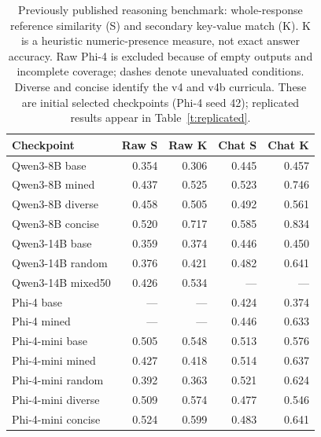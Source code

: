 \begin{table}[t]
\caption{Previously published reasoning benchmark: whole-response reference similarity (S) and secondary key-value match (K). K is a heuristic numeric-presence measure, not exact answer accuracy. Raw Phi-4 is excluded because of empty outputs and incomplete coverage; dashes denote unevaluated conditions. Diverse and concise identify the v4 and v4b curricula. These are initial selected checkpoints (Phi-4 seed 42); replicated results appear in Table~\ref{t:replicated}.}\label{t:energybench}
\centering\small\begin{tabular}{lrrrr}\toprule
Checkpoint & Raw S & Raw K & Chat S & Chat K\\\midrule
Qwen3-8B base & 0.354 & 0.306 & 0.445 & 0.457\\
Qwen3-8B mined & 0.437 & 0.525 & 0.523 & 0.746\\
Qwen3-8B diverse & 0.458 & 0.505 & 0.492 & 0.561\\
Qwen3-8B concise & 0.520 & 0.717 & 0.585 & 0.834\\
Qwen3-14B base & 0.359 & 0.374 & 0.446 & 0.450\\
Qwen3-14B random & 0.376 & 0.421 & 0.482 & 0.641\\
Qwen3-14B mixed50 & 0.426 & 0.534 & --- & ---\\
Phi-4 base & --- & --- & 0.424 & 0.374\\
Phi-4 mined & --- & --- & 0.446 & 0.633\\
Phi-4-mini base & 0.505 & 0.548 & 0.513 & 0.576\\
Phi-4-mini mined & 0.427 & 0.418 & 0.514 & 0.637\\
Phi-4-mini random & 0.392 & 0.363 & 0.521 & 0.624\\
Phi-4-mini diverse & 0.509 & 0.574 & 0.477 & 0.546\\
Phi-4-mini concise & 0.524 & 0.599 & 0.483 & 0.641\\
\bottomrule\end{tabular}\end{table}